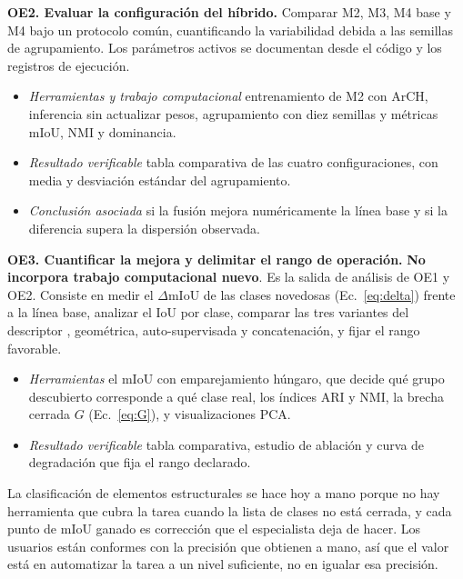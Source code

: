\medskip
\noindent\textbf{OE2. Evaluar la configuración del híbrido.} Comparar M2, M3,
M4 base y M4 bajo un protocolo común, cuantificando la variabilidad debida a las
semillas de agrupamiento. Los parámetros activos se documentan desde el código
y los registros de ejecución.

\begin{itemize}\setlength{\itemsep}{0pt}
\item \textit{Herramientas y trabajo computacional} entrenamiento de M2 con
ArCH, inferencia sin actualizar pesos, agrupamiento con diez semillas y métricas mIoU, NMI
y dominancia.
\item \textit{Resultado verificable} tabla comparativa de las cuatro
configuraciones, con media y desviación estándar del agrupamiento.
\item \textit{Conclusión asociada} si la fusión mejora numéricamente la línea
base y si la diferencia supera la dispersión observada.
\end{itemize}

\medskip
\noindent\textbf{OE3. Cuantificar la mejora y delimitar el rango de operación.}
\textbf{No incorpora trabajo computacional nuevo}. Es la salida de análisis de OE1
y OE2. Consiste en medir el $\Delta$mIoU de las clases novedosas
(Ec.~\eqref{eq:delta}) frente a la línea base, analizar el IoU por clase, comparar las tres variantes del descriptor
, geométrica, auto-supervisada y concatenación,  y fijar el rango favorable.

\begin{itemize}\setlength{\itemsep}{0pt}
\item \textit{Herramientas} el mIoU con emparejamiento húngaro, que decide qué
grupo descubierto corresponde a qué clase real, los índices ARI y NMI, la brecha
cerrada $G$ (Ec.~\eqref{eq:G}), y visualizaciones PCA.
\item \textit{Resultado verificable} tabla comparativa, estudio de ablación y
curva de degradación que fija el rango declarado.
\end{itemize}


La clasificación de elementos estructurales se hace hoy a mano porque no hay
herramienta que cubra la tarea cuando la lista de clases no está cerrada, y cada
punto de mIoU ganado es corrección que el especialista deja de hacer. Los
usuarios están conformes con la precisión que obtienen a mano, así que el valor
está en automatizar la tarea a un nivel suficiente, no en igualar esa precisión.

